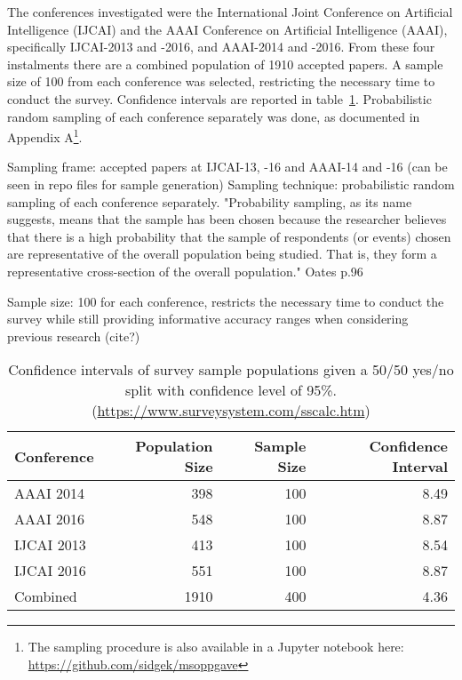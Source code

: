 The conferences investigated were the International Joint Conference on Artificial Intelligence (IJCAI) and the AAAI Conference on Artificial Intelligence (AAAI), specifically IJCAI-2013 and -2016, and AAAI-2014 and -2016. From these four instalments there are a combined population of 1910 accepted papers. A sample size of 100 from each conference was selected, restricting the necessary time to conduct the survey. Confidence intervals are reported in table~\ref{tab:survey-confidence}. Probabilistic random sampling of each conference separately was done, as documented in Appendix A\footnote{The sampling procedure is also available in a Jupyter notebook here: \url{https://github.com/sidgek/msoppgave}}.

Sampling frame: accepted papers at IJCAI-13, -16 and AAAI-14 and -16 (can be seen in repo files for sample generation)
Sampling technique: probabilistic random sampling of each conference separately.
        "Probability sampling, as its name suggests, means that the sample has been chosen because the researcher believes that there is a high probability that the sample of respondents (or events) chosen are representative of the overall population being studied. That is, they form a representative cross-section of the overall population." Oates p.96

Sample size: 100 for each conference, restricts the necessary time to conduct the survey while still providing informative accuracy ranges when considering previous research (cite?)

\begin{table}[!h]
\begin{center}
    \begin{tabular}{  l | r  r  r }
    \textbf{Conference} & \textbf{Population Size} & \textbf{Sample Size} & \textbf{Confidence Interval} \\ \hline
    AAAI 2014 & 398 & 100 & 8.49 \\
    AAAI 2016 & 548 & 100 & 8.87 \\
    IJCAI 2013 & 413 & 100 & 8.54 \\
    IJCAI 2016 & 551 & 100 & 8.87 \\ \hline
    Combined & 1910 & 400 & 4.36 \\
    \end{tabular}
\end{center}
\caption{Confidence intervals of survey sample populations given a 50/50  yes/no split with confidence level of 95\%. (\url{https://www.surveysystem.com/sscalc.htm})}
\label{tab:survey-confidence}
\end{table}

